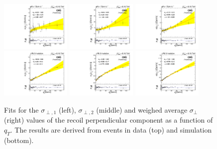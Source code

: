 \begin{figure}[htb!]
 \centering
 \includegraphics[width=0.3\textwidth]{Figures/WBoson/Analysis/Correction/Recoil/RecoilFitsqT/Data/fitPFu2sigma1.pdf}
 \includegraphics[width=0.3\textwidth]{Figures/WBoson/Analysis/Correction/Recoil/RecoilFitsqT/Data/fitPFu2sigma2.pdf}
 \includegraphics[width=0.3\textwidth]{Figures/WBoson/Analysis/Correction/Recoil/RecoilFitsqT/Data/fitPFu2sigma.pdf} \\
 \includegraphics[width=0.3\textwidth]{Figures/WBoson/Analysis/Correction/Recoil/RecoilFitsqT/MC/fitPFu2sigma1.pdf}
 \includegraphics[width=0.3\textwidth]{Figures/WBoson/Analysis/Correction/Recoil/RecoilFitsqT/MC/fitPFu2sigma2.pdf}
 \includegraphics[width=0.3\textwidth]{Figures/WBoson/Analysis/Correction/Recoil/RecoilFitsqT/MC/fitPFu2sigma.pdf}
 \caption{Fits for the $\sigma_{\perp,1}$ (left), $\sigma_{\perp,2}$ (middle) and weighed average $\sigma_{\perp}$ (right) values of the recoil perpendicular component as a function of $q_{T}$. The results are derived from \ZToMuMu events in data (top) and simulation (bottom).}
 \label{fig:figU2RecoilResolutionFit}
\end{figure}

